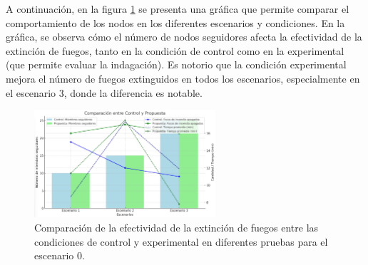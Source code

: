 \documentclass{article}
\begin{document}
A continuación, en la figura \ref{fig:comparison_plot} se presenta una gráfica que permite comparar el comportamiento de los nodos en los diferentes escenarios y condiciones. 
En la gráfica, se observa cómo el número de nodos seguidores afecta la efectividad de la extinción de fuegos, tanto en la condición de control como en la experimental (que permite evaluar la indagación). Es notorio que la condición experimental mejora el número de fuegos extinguidos en todos los escenarios, especialmente en el escenario 3, donde la diferencia es notable.
\begin{figure}[H]
    \centering
    \includegraphics[width=0.6\textwidth]{comparativeExperiments.png}
    \caption{Comparación de la efectividad de la extinción de fuegos entre las condiciones de control y experimental en diferentes pruebas para el escenario 0.}
    \label{fig:comparison_plot}
\end{figure}
\end{document}
